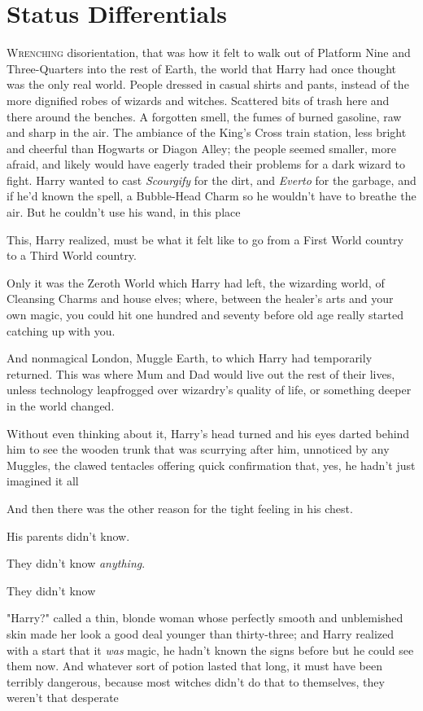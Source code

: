 \chapter{Status Differentials}

\lettrine{W}{renching}
disorientation, that was how it felt to walk out of Platform Nine and
Three-Quarters into the rest of Earth, the world that Harry had once thought
was the only real world. People dressed in casual shirts and pants, instead of
the more dignified robes of wizards and witches. Scattered bits of trash here
and there around the benches. A forgotten smell, the fumes of burned gasoline,
raw and sharp in the air. The ambiance of the King's Cross train station, less
bright and cheerful than Hogwarts or Diagon Alley; the people seemed smaller,
more afraid, and likely would have eagerly traded their problems for a dark
wizard to fight. Harry wanted to cast \emph{Scourgify} for the dirt, and
\emph{Everto} for the garbage, and if he'd known the spell, a Bubble-Head Charm
so he wouldn't have to breathe the air. But he couldn't use his wand, in this
place{\el}

This, Harry realized, must be what it felt like to go from a First World
country to a Third World country.

Only it was the Zeroth World which Harry had left, the wizarding world, of
Cleansing Charms and house elves; where, between the healer's arts and your own
magic, you could hit one hundred and seventy before old age really started
catching up with you.

And nonmagical London, Muggle Earth, to which Harry had temporarily returned.
This was where Mum and Dad would live out the rest of their lives, unless
technology leapfrogged over wizardry's quality of life, or something deeper in
the world changed.

Without even thinking about it, Harry's head turned and his eyes darted behind
him to see the wooden trunk that was scurrying after him, unnoticed by any
Muggles, the clawed tentacles offering quick confirmation that, yes, he hadn't
just imagined it all{\el}

And then there was the other reason for the tight feeling in his chest.

His parents didn't know.

They didn't know \emph{anything}.

They didn't know{\el}

"Harry?" called a thin, blonde woman whose perfectly smooth and unblemished
skin made her look a good deal younger than thirty-three; and Harry realized
with a start that it \emph{was} magic, he hadn't known the signs before but he
could see them now. And whatever sort of potion lasted that long, it must have
been terribly dangerous, because most witches didn't do that to themselves,
they weren't that desperate{\el}

